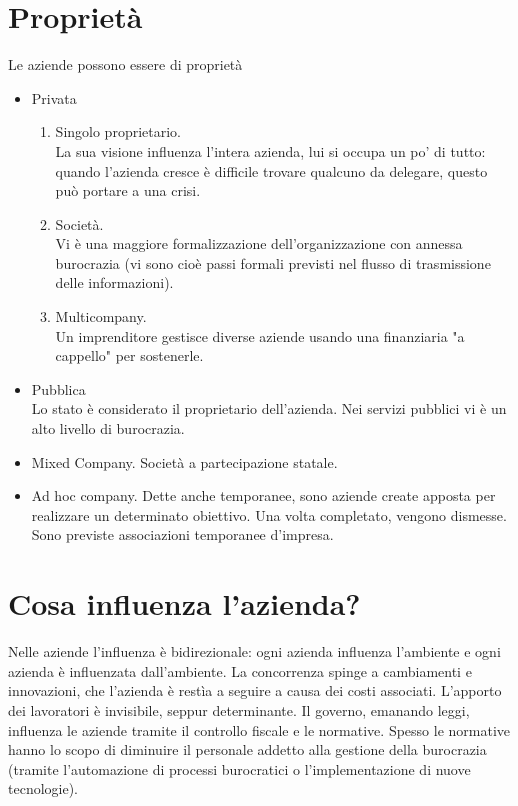 \section{Propriet\`a}
Le aziende possono essere di propriet\`a
\begin{itemize}
\item Privata
\begin{enumerate}
\item Singolo proprietario. \\ La sua visione influenza l'intera azienda, lui si occupa un po' di tutto: quando l'azienda cresce \`e difficile trovare qualcuno da delegare, questo pu\`o portare a una crisi.
\item Societ\`a. \\ Vi \`e una maggiore formalizzazione dell'organizzazione con annessa burocrazia (vi sono cio\`e passi formali previsti nel flusso di trasmissione delle informazioni).
\item Multicompany. \\ Un imprenditore gestisce diverse aziende usando una finanziaria "a cappello" per sostenerle.
\end{enumerate}
\item Pubblica \\ Lo stato \`e considerato il proprietario dell'azienda. Nei servizi pubblici vi \`e un alto livello di burocrazia.
\item Mixed Company. Societ\`a a partecipazione statale.
\item Ad hoc company. Dette anche temporanee, sono aziende create apposta per realizzare un determinato obiettivo. Una volta completato, vengono dismesse. Sono previste associazioni temporanee d'impresa.
\end{itemize}

\section{Cosa influenza l'azienda?}
Nelle aziende l'influenza \`e bidirezionale: ogni azienda influenza l'ambiente e ogni azienda \`e influenzata dall'ambiente.
La concorrenza spinge a cambiamenti e innovazioni, che l'azienda \`e rest\`ia a seguire a causa dei costi associati.
L'apporto dei lavoratori \`e invisibile, seppur determinante.
Il governo, emanando leggi, influenza le aziende tramite il controllo fiscale e le normative. Spesso le normative hanno lo scopo di diminuire il personale addetto alla gestione della burocrazia (tramite l'automazione di processi burocratici o l'implementazione di nuove tecnologie).
